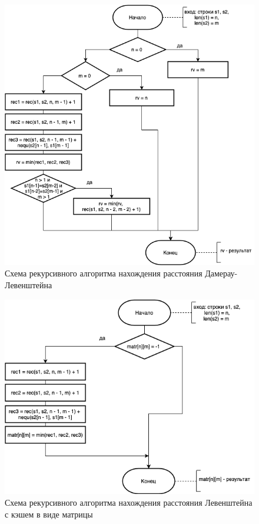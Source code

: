 \documentclass{report}
\begin{document}
\begin{figure}[h!p]\label{recDam}
	\centering
	\includegraphics[scale = 0.7]{recDamLev.drawio.png}
	\caption{Схема рекурсивного алгоритма нахождения расстояния Дамерау-Левенштейна}
	\label{fig:mpr3}
\end{figure}
\newpage

\begin{figure}[h!p]\label{recLevMatr}
	\centering
	\includegraphics[scale = 0.7]{recLevMatr.drawio.png}
	\caption{Схема рекурсивного алгоритма нахождения расстояния Левенштейна с кэшем в виде матрицы}
	\label{fig:mpr4}
\end{figure}
\end{document}
